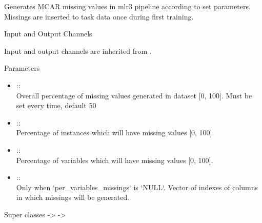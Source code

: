 \documentclass[letterpaper]{book}
\begin{document}
%
\begin{Description}\relax
Generates MCAR missing values in mlr3 pipeline according to set parameters.
Missings are inserted to task data once during first training.
\end{Description}
%
\begin{Section}{Input and Output Channels}

Input and output channels are inherited from .
\end{Section}
%
\begin{Section}{Parameters}

\begin{itemize}

\item{}  :: \\{}
Overall percentage of missing values generated in dataset [0, 100]. Must be set every time, default 50
\item{}  :: \\{}
Percentage of instances which will have missing values [0, 100].
\item{}  :: \\{}
Percentage of variables which will have missing values [0, 100].
\item{}  :: \\{}
Only when `per\_variables\_missings` is `NULL`. Vector of indexes of columns in which missings will be generated.

\end{itemize}

\end{Section}
%
\begin{Section}{Super classes}
 ->  -> 
\end{Section}
%
\end{document}
